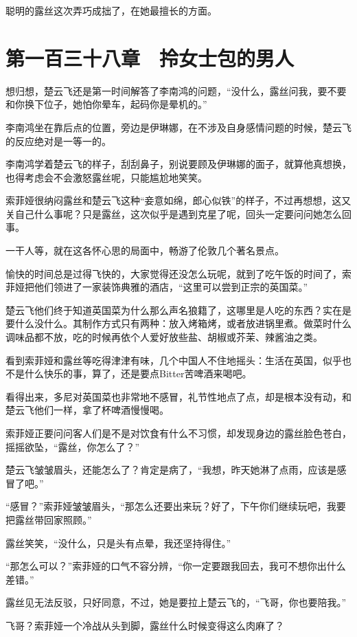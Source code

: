 聪明的露丝这次弄巧成拙了，在她最擅长的方面。

\section{第一百三十八章　拎女士包的男人}

想归想，楚云飞还是第一时间解答了李南鸿的问题，“没什么，露丝问我，要不要和你换下位子，她怕你晕车，起码你是晕机的。”

李南鸿坐在靠后点的位置，旁边是伊琳娜，在不涉及自身感情问题的时候，楚云飞的反应绝对是一等一的。

李南鸿学着楚云飞的样子，刮刮鼻子，别说要顾及伊琳娜的面子，就算他真想换，也得考虑会不会激怒露丝呢，只能尴尬地笑笑。

索菲娅很纳闷露丝和楚云飞这种“妾意如绵，郎心似铁”的样子，不过再想想，这又关自己什么事呢？只是露丝，这次似乎是遇到克星了呢，回头一定要问问她怎么回事。

一干人等，就在这各怀心思的局面中，畅游了伦敦几个著名景点。

愉快的时间总是过得飞快的，大家觉得还没怎么玩呢，就到了吃午饭的时间了，索菲娅把他们领进了一家装饰典雅的酒店，“这里可以尝到正宗的英国菜。”

楚云飞他们终于知道英国菜为什么那么声名狼籍了，这哪里是人吃的东西？实在是要什么没什么。其制作方式只有两种：放入烤箱烤，或者放进锅里煮。做菜时什么调味品都不放，吃的时候再依个人爱好放些盐、胡椒或芥茉、辣酱油之类。

看到索菲娅和露丝等吃得津津有味，几个中国人不住地摇头：生活在英国，似乎也不是什么快乐的事，算了，还是要点Bitter苦啤酒来喝吧。

看得出来，多尼对英国菜也非常地不感冒，礼节性地点了点，却是根本没有动，和楚云飞他们一样，拿了杯啤酒慢慢喝。

索菲娅正要问问客人们是不是对饮食有什么不习惯，却发现身边的露丝脸色苍白，摇摇欲坠，“露丝，你怎么了？”

楚云飞皱皱眉头，还能怎么了？肯定是病了，“我想，昨天她淋了点雨，应该是感冒了吧。”

“感冒？”索菲娅皱皱眉头，“那怎么还要出来玩？好了，下午你们继续玩吧，我要把露丝带回家照顾。”

露丝笑笑，“没什么，只是头有点晕，我还坚持得住。”

“那怎么可以？”索菲娅的口气不容分辨，“你一定要跟我回去，我可不想你出什么差错。”

露丝见无法反驳，只好同意，不过，她是要拉上楚云飞的，“飞哥，你也要陪我。”

飞哥？索菲娅一个冷战从头到脚，露丝什么时候变得这么肉麻了？

